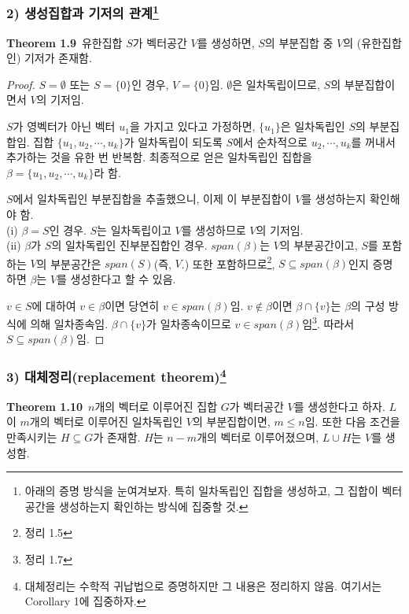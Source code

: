\newpage


\subsubsection*{2) 생성집합과 기저의 관계\footnote{아래의 증명 방식을 눈여겨보자. 특히 일차독립인 집합을 생성하고, 그 집합이 벡터공간을 생성하는지 확인하는 방식에 집중할 것.}}
\textbf{Theorem 1.9}\, 유한집합 $S$가 벡터공간 $V$를 생성하면, $S$의 부분집합 중 $V$의 (유한집합인) 기저가 존재함.

\begin{proof}
$S=\emptyset$ 또는 $S=\{0\}$인 경우, $V=\{0\}$임. $\emptyset$은 일차독립이므로, $S$의 부분집합이면서 $V$의 기저임.

$S$가 영벡터가 아닌 벡터 $u_1$을 가지고 있다고 가정하면, $\{u_1\}$은 일차독립인 $S$의 부분집합임. 집합 $\{u_1,u_2, \cdots ,u_k\}$가 일차독립이 되도록 $S$에서 순차적으로 $u_2, \cdots ,u_k$를 꺼내서 추가하는 것을 유한 번 반복함. 최종적으로 얻은 일차독립인 집합을 $\beta = \{u_1,u_2, \cdots ,u_k\}$라 함.

$S$에서 일차독립인 부분집합을 추출했으니, 이제 이 부분집합이 $V$를 생성하는지 확인해야 함.\\
(i) $\beta = S$인 경우. $S$는 일차독립이고 $V$를 생성하므로 $V$의 기저임.\\
(ii) $\beta$가 $S$의 일차독립인 진부분집합인 경우. $span(\beta)$는 $V$의 부분공간이고, $S$를 포함하는 $V$의 부분공간은 $span(S)$(즉, $V$.) 또한 포함하므로\footnote{정리 1.5}, $S \subseteq span(\beta)$인지 증명하면 $\beta$는 $V$를 생성한다고 할 수 있음.

$v \in S$에 대하여 $v \in \beta$이면 당연히 $v \in span(\beta)$임. $v \notin \beta$이면 $\beta \cap \{v\}$는 $\beta$의 구성 방식에 의해 일차종속임. $\beta \cap \{v\}$가 일차종속이므로 $v \in span(\beta)$임\footnote{정리 1.7}. 따라서 $S \subseteq span(\beta)$임.
\end{proof}

\subsubsection*{3) 대체정리(replacement theorem)\footnote{대체정리는 수학적 귀납법으로 증명하지만 그 내용은 정리하지 않음. 여기서는 Corollary 1에 집중하자.}}
\textbf{Theorem 1.10}\, $n$개의 벡터로 이루어진 집합 $G$가 벡터공간 $V$를 생성한다고 하자. $L$이 $m$개의 벡터로 이루어진 일차독립인 $V$의 부분집합이면, $m \leq n$임. 또한 다음 조건을 만족시키는 $H \subseteq G$가 존재함. $H$는 $n-m$개의 벡터로 이루어졌으며, $L \cup H$는 $V$를 생성함.

